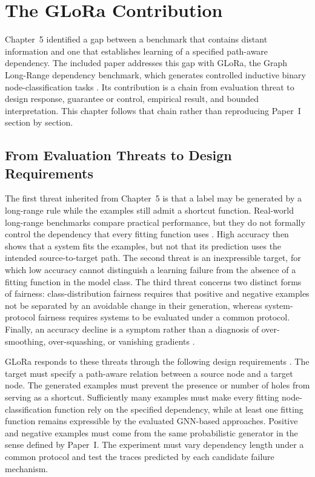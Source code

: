 \chapter{The GLoRa Contribution}
\label{chap:glora-contribution}

Chapter~5 identified a gap between a benchmark that contains distant information and one that establishes learning of a specified path-aware dependency.
The included paper addresses this gap with GLoRa, the Graph Long-Range dependency benchmark, which generates controlled inductive binary node-classification tasks \cite{zhou2025glora}.
Its contribution is a chain from evaluation threat to design response, guarantee or control, empirical result, and bounded interpretation.
This chapter follows that chain rather than reproducing Paper~I section by section.

\section{From Evaluation Threats to Design Requirements}
\label{sec:glora-motivation}

The first threat inherited from Chapter~5 is that a label may be generated by a long-range rule while the examples still admit a shortcut function.
Real-world long-range benchmarks compare practical performance, but they do not formally control the dependency that every fitting function uses \cite{dwivedi2022long,zhou2025glora}.
High accuracy then shows that a system fits the examples, but not that its prediction uses the intended source-to-target path.
The second threat is an inexpressible target, for which low accuracy cannot distinguish a learning failure from the absence of a fitting function in the model class.
The third threat concerns two distinct forms of fairness: class-distribution fairness requires that positive and negative examples not be separated by an avoidable change in their generation, whereas system-protocol fairness requires systems to be evaluated under a common protocol.
Finally, an accuracy decline is a symptom rather than a diagnosis of over-smoothing, over-squashing, or vanishing gradients \cite{li2018deeper,alon2021bottleneck,glorot2010difficulty}.

GLoRa responds to these threats through the following design requirements \cite{zhou2025glora}.
The target must specify a path-aware relation between a source node and a target node.
The generated examples must prevent the presence or number of holes from serving as a shortcut.
Sufficiently many examples must make every fitting node-classification function rely on the specified dependency, while at least one fitting function remains expressible by the evaluated GNN-based approaches.
Positive and negative examples must come from the same probabilistic generator in the sense defined by Paper~I.
The experiment must vary dependency length under a common protocol and test the traces predicted by each candidate failure mechanism.

